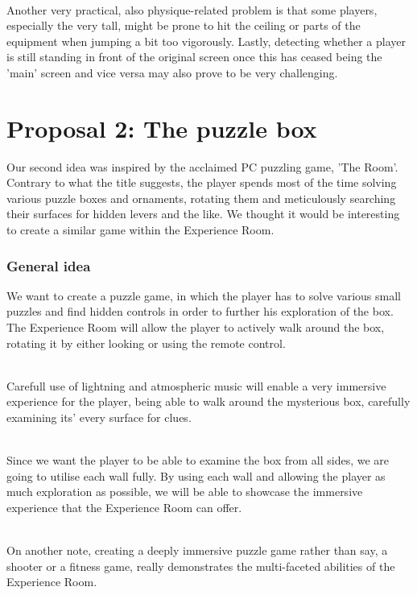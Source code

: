 \documentclass[11pt]{article}
\begin{document}
~\\
Another very practical, also physique-related problem is that some players, especially the very tall, might be prone to hit the ceiling or parts of the equipment when jumping a bit too vigorously. Lastly, detecting whether a player is still standing in front of the original screen once this has ceased being the 'main' screen and vice versa may also prove to be very challenging.


\newpage
{}
{}
\section*{Proposal 2:  The puzzle box}
Our second idea was inspired by the acclaimed PC puzzling game, 'The Room'. Contrary to what the title suggests, the player spends most of the time solving various puzzle boxes and ornaments, rotating them and meticulously searching their surfaces for hidden levers and the like. We thought it would be interesting to create a similar game within the Experience Room.

\subsubsection*{General idea}
We want to create a puzzle game, in which the player has to solve various small puzzles and find hidden controls in order to further his exploration of the box. The Experience Room will allow the player to actively walk around the box, rotating it by either looking or using the remote control.

~\\
Carefull use of lightning and atmospheric music will enable a very immersive experience for the player, being able to walk around the mysterious box, carefully examining its' every surface for clues.

~\\
Since we want the player to be able to examine the box from all sides, we are going to utilise each wall fully. By using each wall and allowing the player as much exploration as possible, we will be able to showcase the immersive experience that the Experience Room can offer. 

~\\
On another note, creating a deeply immersive puzzle game rather than say, a shooter or a fitness game, really demonstrates the multi-faceted abilities of the Experience Room.

\newpage
{}
\end{document}
